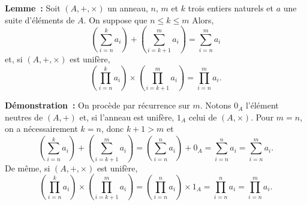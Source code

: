    \done

\medskip

\noindent\textbf{Lemme :} Soit $(A, +, \times)$ un anneau, $n$, $m$ et $k$ trois entiers naturels et $a$ une suite d'éléments de $A$. 
    On suppose que $n \leq k \leq m$
    Alors,
    \begin{equation*}
        \left( \sum_{i=n}^k a_i \right) + \left( \sum_{i=k+1}^m a_i \right) = \sum_{i=n}^m a_i
    \end{equation*}
    et, si $(A, +, \times)$ est unifère,
    \begin{equation*}
        \left( \prod_{i=n}^k a_i \right) \times \left( \prod_{i=k+1}^m a_i \right) = \prod_{i=n}^m a_i.
    \end{equation*}

\medskip

\noindent\textbf{Démonstration :}  
    On procède par récurrence sur $m$.
    Notons $0_A$ l'élément neutres de $(A, +)$ et, si l'anneau est unifère, $1_A$ celui de $(A, \times)$.
    Pour $m = n$, on a nécessairement $k = n$, donc $k+1 > m$ et 
    \begin{equation*}
        \left( \sum_{i=n}^k a_i \right) + \left( \sum_{i=k+1}^m a_i \right) 
        = \left( \sum_{i=n}^n a_i \right) + 0_A
        = \sum_{i=n}^n a_i 
        = \sum_{i=n}^m a_i .
    \end{equation*}
    De même, si $(A, +, \times)$ est unifère, 
    \begin{equation*}
        \left( \prod_{i=n}^k a_i \right) \times \left( \prod_{i=k+1}^m a_i \right) 
        = \left( \prod_{i=n}^n a_i \right) \times 1_A
        = \prod_{i=n}^n a_i 
        = \prod_{i=n}^m a_i .
    \end{equation*}

